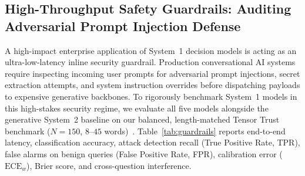\documentclass[10pt]{article}
\begin{document}
\subsection{High-Throughput Safety Guardrails: Auditing Adversarial Prompt Injection Defense}
\label{sec:guardrails}
A high-impact enterprise application of System~1 decision models is acting as an ultra-low-latency inline security guardrail. Production conversational AI systems require inspecting incoming user prompts for adversarial prompt injections, secret extraction attempts, and system instruction overrides before dispatching payloads to expensive generative backbones.
To rigorously benchmark System~1 models in this high-stakes security regime, we evaluate all five models alongside the generative System~2 baseline on our balanced, length-matched Tensor Trust benchmark ($N=150$, $8$--$45$ words)~\cite{toyer2023tensortrust}.
Table~\ref{tab:guardrails} reports end-to-end latency, classification accuracy, attack detection recall (True Positive Rate, TPR), false alarms on benign queries (False Positive Rate, FPR), calibration error ($\text{ECE}_w$), Brier score, and cross-question interference.
\end{document}
